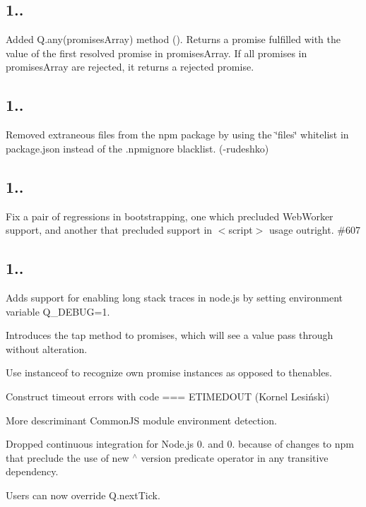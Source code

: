 \subsection*{1..}


\begin{DoxyItemize}
\item Added Q.\+any(promises\+Array) method (). Returns a promise fulfilled with the value of the first resolved promise in promises\+Array. If all promises in promises\+Array are rejected, it returns a rejected promise.
\end{DoxyItemize}

\subsection*{1..}


\begin{DoxyItemize}
\item Removed extraneous files from the npm package by using the \char`\"{}files\char`\"{} whitelist in package.\+json instead of the .npmignore blacklist. (-\/rudeshko)
\end{DoxyItemize}

\subsection*{1..}


\begin{DoxyItemize}
\item Fix a pair of regressions in bootstrapping, one which precluded Web\+Worker support, and another that precluded support in {\ttfamily $<$script$>$} usage outright. \#607
\end{DoxyItemize}

\subsection*{1..}


\begin{DoxyItemize}
\item Adds support for enabling long stack traces in node.\+js by setting environment variable {\ttfamily Q\+\_\+\+D\+E\+B\+UG=1}.
\item Introduces the {\ttfamily tap} method to promises, which will see a value pass through without alteration.
\item Use instanceof to recognize own promise instances as opposed to thenables.
\item Construct timeout errors with {\ttfamily code === E\+T\+I\+M\+E\+D\+O\+UT} (Kornel Lesiński)
\item More descriminant Common\+JS module environment detection.
\item Dropped continuous integration for Node.\+js 0. and 0. because of changes to npm that preclude the use of new {\ttfamily $^\wedge$} version predicate operator in any transitive dependency.
\item Users can now override {\ttfamily Q.\+next\+Tick}.
\end{DoxyItemize}

